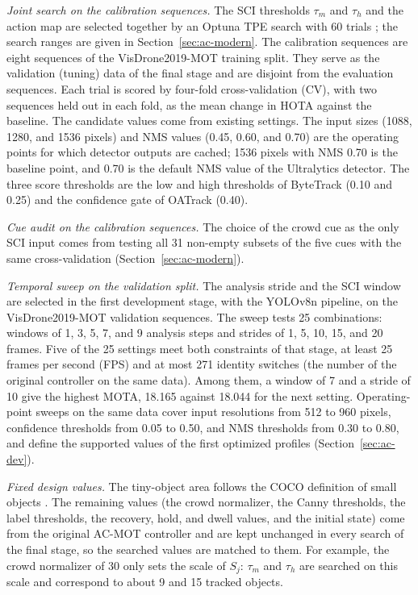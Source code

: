\emph{Joint search on the calibration sequences.} The SCI thresholds $\tau_m$ and $\tau_h$ and the action map are selected together by an Optuna TPE search with 60 trials \cite{akiba2019optuna}; the search ranges are given in Section~\ref{sec:ac-modern}. The calibration sequences are eight sequences of the VisDrone2019-MOT training split. They serve as the validation (tuning) data of the final stage and are disjoint from the evaluation sequences. Each trial is scored by four-fold cross-validation (CV), with two sequences held out in each fold, as the mean change in HOTA against the baseline. The candidate values come from existing settings. The input sizes (1088, 1280, and 1536 pixels) and NMS values (0.45, 0.60, and 0.70) are the operating points for which detector outputs are cached; 1536 pixels with NMS 0.70 is the baseline point, and 0.70 is the default NMS value of the Ultralytics detector. The three score thresholds are the low and high thresholds of ByteTrack (0.10 and 0.25) and the confidence gate of OATrack (0.40).

\emph{Cue audit on the calibration sequences.} The choice of the crowd cue as the only SCI input comes from testing all 31 non-empty subsets of the five cues with the same cross-validation (Section~\ref{sec:ac-modern}).

\emph{Temporal sweep on the validation split.} The analysis stride and the SCI window are selected in the first development stage, with the YOLOv8n pipeline, on the VisDrone2019-MOT validation sequences. The sweep tests 25 combinations: windows of 1, 3, 5, 7, and 9 analysis steps and strides of 1, 5, 10, 15, and 20 frames. Five of the 25 settings meet both constraints of that stage, at least 25 frames per second (FPS) and at most 271 identity switches (the number of the original controller on the same data). Among them, a window of 7 and a stride of 10 give the highest MOTA, 18.165 against 18.044 for the next setting. Operating-point sweeps on the same data cover input resolutions from 512 to 960 pixels, confidence thresholds from 0.05 to 0.50, and NMS thresholds from 0.30 to 0.80, and define the supported values of the first optimized profiles (Section~\ref{sec:ac-dev}).

\emph{Fixed design values.} The tiny-object area follows the COCO definition of small objects \cite{lin2014coco}. The remaining values (the crowd normalizer, the Canny thresholds, the label thresholds, the recovery, hold, and dwell values, and the initial state) come from the original AC-MOT controller and are kept unchanged in every search of the final stage, so the searched values are matched to them. For example, the crowd normalizer of 30 only sets the scale of $S_j$: $\tau_m$ and $\tau_h$ are searched on this scale and correspond to about 9 and 15 tracked objects.

